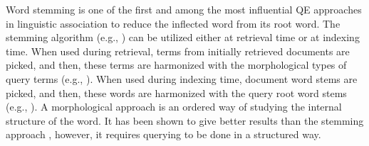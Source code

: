 Word stemming is one of the first and among the most influential QE approaches in linguistic association to reduce the inflected word from its root word. The stemming algorithm (e.g., \cite{porter1980algorithm}) can be utilized either at retrieval time or at indexing time. When used during retrieval, terms from initially retrieved documents are picked, and then, these terms are harmonized with the morphological types of query terms (e.g., \cite{krovetz1993viewing,paice1994evaluation}). When used during indexing time, document word stems are picked, and then, these words are harmonized with the query root word stems (e.g., \cite{hull1996stemming}). A morphological approach is an ordered way of studying the internal structure of the word. It has been shown to give better results than the stemming approach \cite{bilotti2004works,moreau2007automatic}, however, it requires querying to be done in a structured way.

